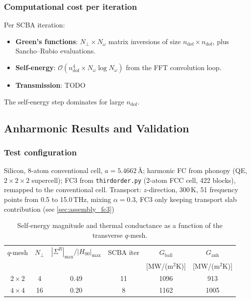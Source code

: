 \subsubsection{Computational cost per iteration}

Per SCBA iteration:
\begin{itemize}
  \item \textbf{Green's functions}: $N_\perp \times N_\omega$ matrix
        inversions of size $n_\mathrm{dof}\times n_\mathrm{dof}$, plus
        Sancho--Rubio evaluations.
  \item \textbf{Self-energy}:
        $\mathcal{O}(n_\mathrm{dof}^4 \times N_\omega\log N_\omega)$
        from the FFT convolution loop.
  \item \textbf{Transmission}: TODO
\end{itemize}
The self-energy step dominates for large $n_\mathrm{dof}$.


\subsection{Anharmonic Results and Validation}
\label{sec:anharmonic_results}

\subsubsection{Test configuration}

Silicon, 8-atom conventional cell, $a = 5.4662$\,\AA; harmonic FC
from phonopy (QE, $2\times2\times2$ supercell); FC3 from
\texttt{thirdorder.py} (2-atom FCC cell, 422 blocks), remapped to the
conventional cell.  Transport: $z$-direction, 300\,K, 51 frequency
points from 0.5 to 15.0\,THz, mixing $\alpha = 0.3$, FC3 only keeping
transport slab contribution (see \cref{sec:assembly_fc3})

\begin{table}[h]
\centering
\caption{Self-energy magnitude and thermal conductance as a function
of the transverse $q$-mesh.}
\label{tab:scaling_anh}
\begin{tabular}{cccccc}
  \toprule
  $q$-mesh & $N_\perp$ &
    $|\Sigma^R|_\mathrm{max}/|H_{00}|_\mathrm{max}$ &
    SCBA iter &
    $G_\mathrm{ball}$ &
    $G_\mathrm{anh}$ \\
  & & & & [MW/(m$^2$K)] & [MW/(m$^2$K)] \\
  \midrule
  $2\times2$ & 4  & 0.49 & 11 & 1096 &  913 \\
  $4\times4$ & 16 & 0.20 &  8 & 1162 & 1005 \\
  \bottomrule
\end{tabular}
\end{table}


